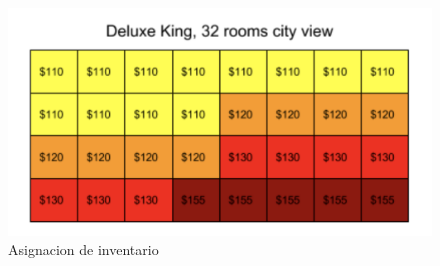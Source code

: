 \documentclass{article}\usepackage[]{graphicx}\usepackage[]{color}
\begin{document}
\begin{figure}[!]
  \includegraphics[width=\linewidth]{Imagenes/buckets.png}
  \caption{Asignacion de inventario}
  \label{fig:Asignacion de Inventario}
\end{figure}
\end{document}
